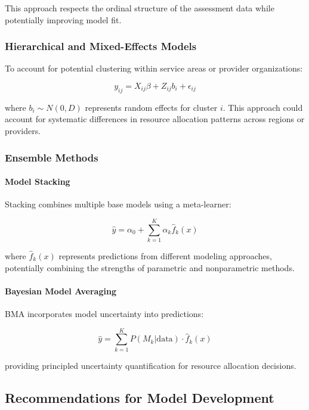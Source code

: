 \documentclass[12pt]{article}
\begin{document}
This approach respects the ordinal structure of the assessment data while potentially improving model fit.

\subsubsection{Hierarchical and Mixed-Effects Models}

To account for potential clustering within service areas or provider organizations:

\begin{equation}
y_{ij} = X_{ij}\beta + Z_{ij}b_i + \epsilon_{ij}
\end{equation}

where $b_i \sim N(0,D)$ represents random effects for cluster $i$. This approach could account for systematic differences in resource allocation patterns across regions or providers.

\subsubsection{Ensemble Methods}

\paragraph{Model Stacking}
Stacking combines multiple base models using a meta-learner:

\begin{equation}
\hat{y} = \alpha_0 + \sum_{k=1}^K \alpha_k \hat{f}_k(x)
\end{equation}

where $\hat{f}_k(x)$ represents predictions from different modeling approaches, potentially combining the strengths of parametric and nonparametric methods.

\paragraph{Bayesian Model Averaging}
BMA incorporates model uncertainty into predictions:

\begin{equation}
\hat{y} = \sum_{k=1}^K P(M_k|\text{data}) \cdot \hat{f}_k(x)
\end{equation}

providing principled uncertainty quantification for resource allocation decisions.

\subsection{Recommendations for Model Development}
\end{document}
